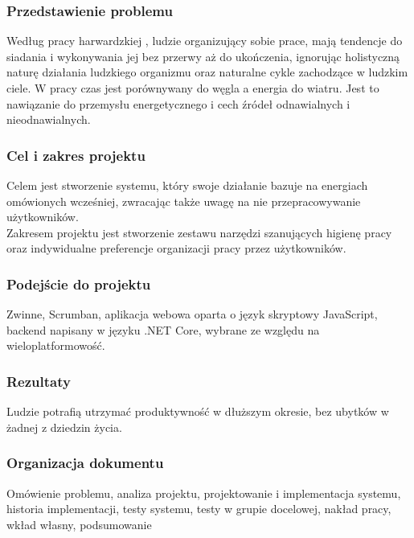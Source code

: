 \documentclass[a4paper,11pt]{report}
\begin{document}
\subsubsection{Przedstawienie problemu}
Według pracy harwardzkiej \cite{Harward}, ludzie organizujący sobie prace, mają tendencje do siadania i wykonywania jej bez przerwy aż do ukończenia,
 ignorując holistyczną naturę działania ludzkiego organizmu oraz naturalne cykle zachodzące w ludzkim ciele.
 W pracy czas jest porównywany do węgla a energia do wiatru.
 Jest to nawiązanie do przemysłu energetycznego i cech źródeł odnawialnych i nieodnawialnych.

\subsubsection{Cel i zakres projektu}
Celem jest stworzenie systemu, który swoje działanie bazuje na energiach omówionych wcześniej,
 zwracając także uwagę na nie przepracowywanie użytkowników.\\
Zakresem projektu jest stworzenie zestawu narzędzi szanujących higienę pracy
 oraz indywidualne preferencje organizacji pracy przez użytkowników.

\subsubsection{Podejście do projektu}
Zwinne, Scrumban, aplikacja webowa oparta o język skryptowy JavaScript, backend napisany w języku .NET Core, wybrane ze względu na wieloplatformowość.

\subsubsection{Rezultaty}
Ludzie potrafią utrzymać produktywność w dłuższym okresie, bez ubytków w żadnej z dziedzin życia.

\subsubsection{Organizacja dokumentu}
Omówienie problemu, analiza projektu, projektowanie i implementacja systemu, historia implementacji,
 testy systemu, testy w grupie docelowej, nakład pracy, wkład własny, podsumowanie
\end{document}
